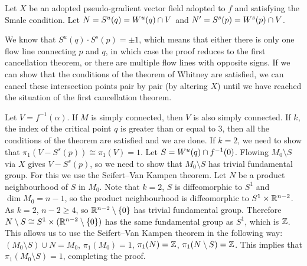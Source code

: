 \begin{myproof}
    Let $X$ be an adopted pseudo-gradient vector field adopted to  $f$ and satisfying the Smale condition.
    Let $N = S^{u}(q) = W^u(q) \cap V$ and $N' = S^{s}(p) = W^s(p) \cap  V$.

    We know that $S^{u}(q) \cdot S^{s}(p) = \pm 1$, which means that either there is only one flow line connecting $p$ and  $q$, in which case the proof reduces to the first cancellation theorem, or there are multiple flow lines with opposite signs.
    If we can show that the conditions of the theorem of Whitney are satisfied, we can cancel these intersection points pair by pair (by altering $X$) until we have reached the situation of the first cancellation theorem.

    Let $V = f^{-1}(\alpha)$.  If $M$ is simply connected, then $V$ is also simply connected.
    If $k$, the index of the critical point $q$ is greater than or equal to $3$, then all the conditions of the theorem are satisfied and we are done.
    If $k = 2$, we need to show that  $\pi_1(V - S^{s}(p)) \cong \pi_1(V) = 1$.
    Let $S = W^u(q) \cap f^{-1}(0)$.
    Flowing $M_0 \setminus S$ via $X$ gives  $V - S^{s}(p)$, so we need to show that $M_0 \setminus S$ has trivial fundamental group.
    For this we use the Seifert--Van Kampen theorem. Let $N$ be a product neighbourhood of $S$ in $M_0$.
    Note that $k=2$, $S$ is diffeomorphic to $S^{1}$ and $\dim M_0 = n-1$, so the product neighbourhood is diffeomorphic to $ S^1 \times \mathbb{R}^{n-2}$.
    As $k=2$, $n - 2 \ge 4$, so $\mathbb{R}^{n-2} \setminus \{ 0 \} $ has trivial fundamental group. Therefore $N \setminus S \cong S^{1} \times (\mathbb{R}^{n-2}\setminus \{0\})$ has the same fundamental group as $S^{1}$, which is $\mathbb{Z}$.
    This allows us to use the Seifert--Van Kampen theorem in the following way:
    $(M_0 \setminus S) \cup N = M_0$, $\pi_1(M_0) = 1$,  $\pi_1(N) = \mathbb{Z}$,  $\pi_1(N \setminus S) = \mathbb{Z}$. This implies that $\pi_1(M_0 \setminus S) = 1$, completing the proof.
\end{myproof}


